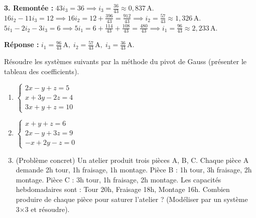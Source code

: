 \documentclass[11pt]{article}
\begin{document}
\begin{exoresolu}
\textbf{3. Remontée :}
$43 i_3 = 36 \implies i_3 = \frac{36}{43} \approx 0,837\,\text{A}$.
$16 i_2 - 11 i_3 = 12 \implies 16 i_2 = 12 + \frac{396}{43} = \frac{912}{43} \implies i_2 = \frac{57}{43} \approx 1,326\,\text{A}$.
$5 i_1 - 2 i_2 - 3 i_3 = 6 \implies 5 i_1 = 6 + \frac{114}{43} + \frac{108}{43} = \frac{480}{43} \implies i_1 = \frac{96}{43} \approx 2,233\,\text{A}$.

\textbf{Réponse :} $i_1 = \frac{96}{43}\,\text{A},\; i_2 = \frac{57}{43}\,\text{A},\; i_3 = \frac{36}{43}\,\text{A}$.
\end{exoresolu}

\begin{exercice}
Résoudre les systèmes suivants par la méthode du pivot de Gauss (présenter le tableau des coefficients).
\begin{enumerate}
    \item $\begin{cases} 2x - y + z = 5 \\ x + 3y - 2z = 4 \\ 3x + y + z = 10 \end{cases}$
    \item $\begin{cases} x + y + z = 6 \\ 2x - y + 3z = 9 \\ -x + 2y - z = 0 \end{cases}$
    \item (Problème concret) Un atelier produit trois pièces A, B, C. Chaque pièce A demande 2h tour, 1h fraisage, 1h montage. Pièce B : 1h tour, 3h fraisage, 2h montage. Pièce C : 3h tour, 1h fraisage, 2h montage. Les capacités hebdomadaires sont : Tour 20h, Fraisage 18h, Montage 16h. Combien produire de chaque pièce pour saturer l'atelier ? (Modéliser par un système 3×3 et résoudre).
\end{enumerate}
\end{exercice}
\end{document}
